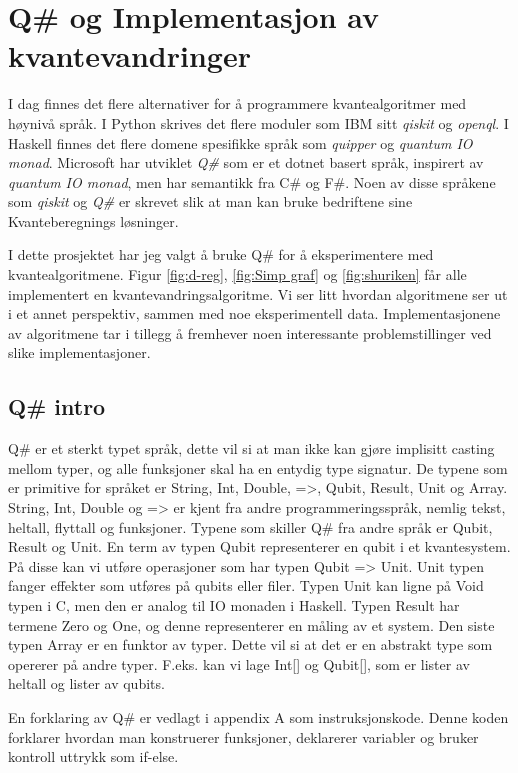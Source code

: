 \section{Q\# og Implementasjon av kvantevandringer}

    I dag finnes det flere alternativer for å programmere kvantealgoritmer med høynivå språk. I Python skrives det flere moduler som IBM sitt \emph{qiskit} og \emph{openql}. I Haskell finnes det flere domene spesifikke språk som \emph{quipper} og \emph{quantum IO monad}. Microsoft har utviklet \emph{Q\#} som er et dotnet basert språk, inspirert av \emph{quantum IO monad}, men har semantikk fra C\# og F\#. Noen av disse språkene som \emph{qiskit} og \emph{Q\#} er skrevet slik at man kan bruke bedriftene sine Kvanteberegnings løsninger.

    I dette prosjektet har jeg valgt å bruke Q\# for å eksperimentere med kvantealgoritmene. Figur \ref{fig:d-reg}, \ref{fig:Simp graf} og \ref{fig:shuriken} får alle implementert en kvantevandringsalgoritme. Vi ser litt hvordan algoritmene ser ut i et annet perspektiv, sammen med noe eksperimentell data. Implementasjonene av algoritmene tar i tillegg å fremhever noen interessante problemstillinger ved slike implementasjoner.

    \subsection{Q\# intro}

        Q\# er et sterkt typet språk, dette vil si at man ikke kan gjøre implisitt casting mellom typer, og alle funksjoner skal ha en entydig type signatur. De typene som er primitive for språket er String, Int, Double, =>, Qubit, Result, Unit og Array. String, Int, Double og => er kjent fra andre programmeringsspråk, nemlig tekst, heltall, flyttall og funksjoner. Typene som skiller Q\# fra andre språk er Qubit, Result og Unit. En term av typen Qubit representerer en qubit i et kvantesystem. På disse kan vi utføre operasjoner som har typen Qubit => Unit. Unit typen fanger effekter som utføres på qubits eller filer. Typen Unit kan ligne på Void typen i C, men den er analog til IO monaden i Haskell. Typen Result har termene Zero og One, og denne representerer en måling av et system. Den siste typen Array er en funktor av typer. Dette vil si at det er en abstrakt type som opererer på andre typer. F.eks. kan vi lage Int[] og Qubit[], som er lister av heltall og lister av qubits.

        En forklaring av Q\# er vedlagt i appendix A som instruksjonskode. Denne koden forklarer hvordan man konstruerer funksjoner, deklarerer variabler og bruker kontroll uttrykk som if-else.

